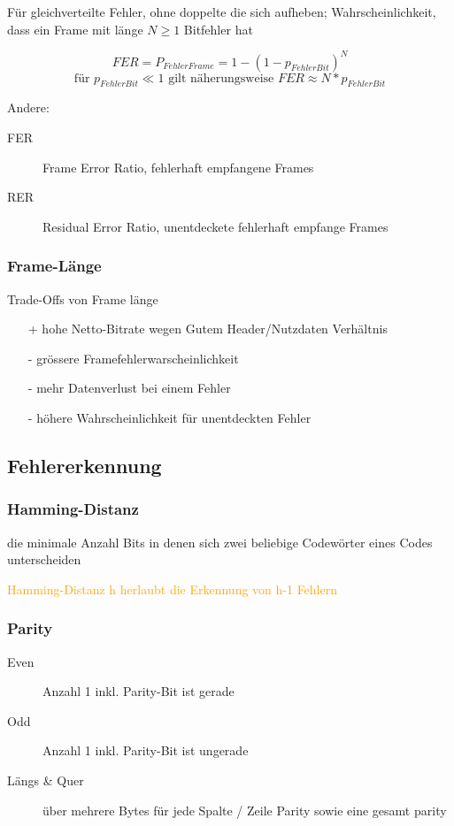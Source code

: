 Für gleichverteilte Fehler, ohne doppelte die sich aufheben; Wahrscheinlichkeit, dass ein Frame mit
länge $N \ge 1$ Bitfehler hat

$$FER = P_{Fehler Frame} = 1 - (1 - p_{Fehler Bit})^N $$
$$ \text{für } p_{Fehler Bit} \ll 1 \text{ gilt näherungsweise }
	FER \approx N * p_{Fehler Bit}$$

Andere:
\begin{description}
	\item[FER] Frame Error Ratio, fehlerhaft empfangene Frames
	\item[RER] Residual Error Ratio, unentdeckete fehlerhaft empfange Frames
\end{description}

\subsubsection{Frame-Länge}
Trade-Offs von Frame länge
\begin{itemize}
	\item[+] hohe Netto-Bitrate wegen Gutem Header/Nutzdaten Verhältnis
	\item[-] grössere Framefehlerwarscheinlichkeit
	\item[-] mehr Datenverlust bei einem Fehler
	\item[-] höhere Wahrscheinlichkeit für unentdeckten Fehler
\end{itemize}

\subsection{Fehlererkennung}

\subsubsection{Hamming-Distanz}
die minimale Anzahl Bits in denen sich zwei beliebige Codewörter eines
Codes unterscheiden

\textcolor{orange}{Hamming-Distanz h herlaubt die Erkennung von h-1 Fehlern}

\subsubsection{Parity}
\begin{description}
	\item[Even] Anzahl 1 inkl. Parity-Bit ist gerade
	\item[Odd] Anzahl 1 inkl. Parity-Bit ist ungerade
	\item[Längs \& Quer] über mehrere Bytes für jede Spalte / Zeile Parity
		sowie eine gesamt parity
\end{description}


